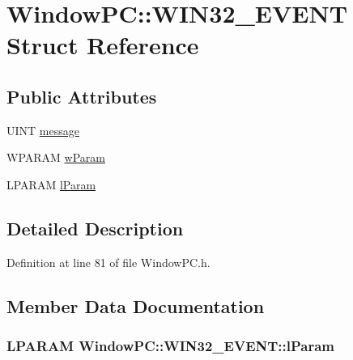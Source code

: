 \hypertarget{struct_window_p_c_1_1_w_i_n32___e_v_e_n_t}{}\section{Window\+PC\+:\+:W\+I\+N32\+\_\+\+E\+V\+E\+NT Struct Reference}
\label{struct_window_p_c_1_1_w_i_n32___e_v_e_n_t}
\subsection*{Public Attributes}
\begin{DoxyCompactItemize}
\item 
U\+I\+NT \hyperlink{struct_window_p_c_1_1_w_i_n32___e_v_e_n_t_a2e5b34b5b59137ceedfcbf252695f146}{message}
\item 
W\+P\+A\+R\+AM \hyperlink{struct_window_p_c_1_1_w_i_n32___e_v_e_n_t_ac895aec4d3d1953b85923f0a5da45004}{w\+Param}
\item 
L\+P\+A\+R\+AM \hyperlink{struct_window_p_c_1_1_w_i_n32___e_v_e_n_t_a13a17a5f5efbfb902556ab01a3f825f6}{l\+Param}
\end{DoxyCompactItemize}


\subsection{Detailed Description}


Definition at line 81 of file Window\+P\+C.\+h.



\subsection{Member Data Documentation}
\subsubsection[{\texorpdfstring{l\+Param}{lParam}}]{\setlength{\rightskip}{0pt plus 5cm}L\+P\+A\+R\+AM Window\+P\+C\+::\+W\+I\+N32\+\_\+\+E\+V\+E\+N\+T\+::l\+Param}\hypertarget{struct_window_p_c_1_1_w_i_n32___e_v_e_n_t_a13a17a5f5efbfb902556ab01a3f825f6}{}\label{struct_window_p_c_1_1_w_i_n32___e_v_e_n_t_a13a17a5f5efbfb902556ab01a3f825f6}


